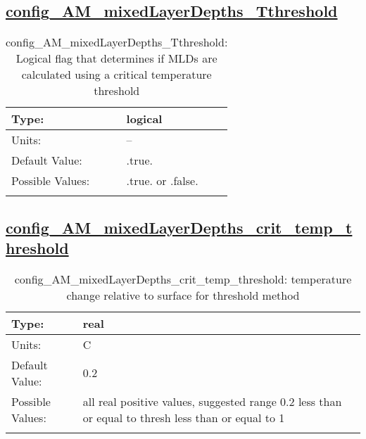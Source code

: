 \subsection[config\_AM\_mixedLayerDepths\_Tthreshold]{\hyperref[sec:nm_tab_AM_mixedLayerDepths]{config\_AM\_mixedLayerDepths\_Tthreshold}}
\label{subsec:nm_sec_config_AM_mixedLayerDepths_Tthreshold}
\begin{center}
\begin{longtable}{| p{2.0in} || p{4.0in} |}
    \hline
    Type: & logical \\
    \hline
    Units: & -- \\
    \hline
    Default Value: & .true. \\
    \hline
    Possible Values: & .true. or .false. \\
    \hline
    \caption{config\_AM\_mixedLayerDepths\_Tthreshold: Logical flag that determines if MLDs are calculated using a critical temperature threshold}
\end{longtable}
\end{center}
\subsection[config\_AM\_mixedLayerDepths\_crit\_temp\_threshold]{\hyperref[sec:nm_tab_AM_mixedLayerDepths]{config\_AM\_mixedLayerDepths\_crit\_temp\_threshold}}
\label{subsec:nm_sec_config_AM_mixedLayerDepths_crit_temp_threshold}
\begin{center}
\begin{longtable}{| p{2.0in} || p{4.0in} |}
    \hline
    Type: & real \\
    \hline
    Units: & \si{C} \\
    \hline
    Default Value: & 0.2 \\
    \hline
    Possible Values: & all real positive values, suggested range 0.2 less than or equal to thresh less than or equal to 1 \\
    \hline
    \caption{config\_AM\_mixedLayerDepths\_crit\_temp\_threshold: temperature change relative to surface for threshold method}
\end{longtable}
\end{center}
